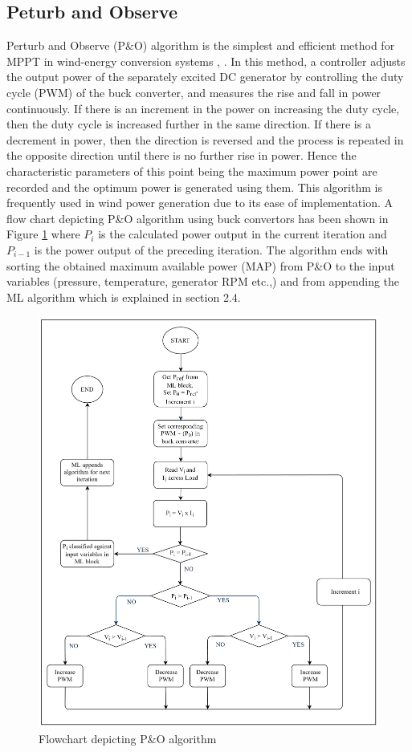 \subsection{Peturb and Observe}
Perturb and Observe (P\&O) algorithm is the simplest and efficient method for MPPT in wind-energy conversion systems \cite{RefJ13}, \cite{RefJ14}. In this method, a controller adjusts the output power of the separately excited DC generator by controlling the duty cycle (PWM) of the buck converter, and measures the rise and fall in power continuously. If there is an increment in the power on increasing the duty cycle, then the duty cycle is increased further in the same direction. If there is a decrement in power, then the direction is reversed and the process is repeated in the opposite direction until there is no further rise in power. Hence the characteristic parameters of this point being the maximum power point are recorded and the optimum power is generated using them. This algorithm is frequently used in wind power generation due to its ease of implementation. A flow chart depicting P\&O algorithm using buck convertors has been shown in Figure \ref{Figure:5} where $ P_i$ is the calculated power output in the current iteration and $P_{i-1}$ is the power output of the preceding iteration. The algorithm ends with sorting the obtained maximum available power (MAP) from P\&O to the input variables (pressure, temperature, generator RPM etc.,) and from appending the ML algorithm which is explained in section 2.4.
\begin{center}
\begin{figure}
\includegraphics[width=12cm,keepaspectratio]{5.png}
\caption{Flowchart depicting P\&O algorithm}
\label{Figure:5}    
\end{figure}
\end{center}
